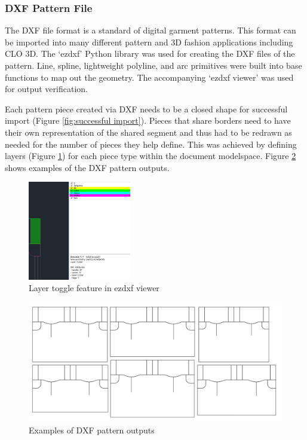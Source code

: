 \subsubsection{DXF Pattern File}
The DXF file format is a standard of digital garment patterns. This format can be imported into many different pattern and 3D fashion applications including CLO 3D. The `ezdxf’ Python library \cite{noauthor_spline_nodate} was used for creating the DXF files of the pattern. Line, spline, lightweight polyline, and arc primitives were built into base functions to map out the geometry. The accompanying `ezdxf viewer’ was used for output verification.

Each pattern piece created via DXF needs to be a closed shape for successful import (Figure \ref{fig:successful import}). Pieces that share borders need to have their own representation of the shared segment and thus had to be redrawn as needed for the number of pieces they help define. This was achieved by defining layers (Figure \ref{fig:layer toggle}) for each piece type within the document modelspace. Figure \ref{fig:example dxfs} shows examples of the DXF pattern outputs.

\begin{figure} [H]
    \centering
    \includegraphics[width = 0.4\textwidth]{Images/dxf viewer.png}
    \caption{Layer toggle feature in ezdxf viewer}
    \label{fig:layer toggle}
\end{figure}

\begin{figure} [H]
    \centering
    \includegraphics[width = \textwidth]{Images/example dxfs.png}
    \caption{Examples of DXF pattern outputs}
    \label{fig:example dxfs}
\end{figure}

